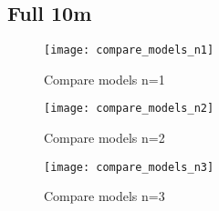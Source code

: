 \subsection{Full 10m}
\begin{figure}[H]
  \centering
  \texttt{[image: compare\_models\_n1]}
  \caption{Compare models n=1}
  \label{fig:compare_models_n1}
\end{figure}
\begin{figure}[H]
  \centering
  \texttt{[image: compare\_models\_n2]}
  \caption{Compare models n=2}
  \label{fig:compare_models_n2}
\end{figure}
\begin{figure}[H]
  \centering
  \texttt{[image: compare\_models\_n3]}
  \caption{Compare models n=3}
  \label{fig:compare_models_n3}
\end{figure}
